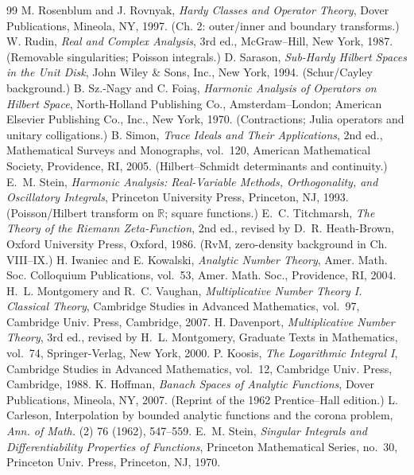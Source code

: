 \documentclass[11pt]{article}
\theoremstyle{definition}
\theoremstyle{remark}
\theoremstyle{definition}
\begin{document}
\begin{thebibliography}{99}
 M. Rosenblum and J. Rovnyak, \emph{Hardy Classes and Operator Theory}, Dover Publications, Mineola, NY, 1997. (Ch. 2: outer/inner and boundary transforms.)
 W. Rudin, \emph{Real and Complex Analysis}, 3rd ed., McGraw--Hill, New York, 1987. (Removable singularities; Poisson integrals.)
 D. Sarason, \emph{Sub-Hardy Hilbert Spaces in the Unit Disk}, John Wiley \& Sons, Inc., New York, 1994. (Schur/Cayley background.)
 B. Sz.-Nagy and C. Foia\c s, \emph{Harmonic Analysis of Operators on Hilbert Space}, North-Holland Publishing Co., Amsterdam--London; American Elsevier Publishing Co., Inc., New York, 1970. (Contractions; Julia operators and unitary colligations.)
 B. Simon, \emph{Trace Ideals and Their Applications}, 2nd ed., Mathematical Surveys and Monographs, vol.~120, American Mathematical Society, Providence, RI, 2005. (Hilbert--Schmidt determinants and continuity.)
 E.~M. Stein, \emph{Harmonic Analysis: Real-Variable Methods, Orthogonality, and Oscillatory Integrals}, Princeton University Press, Princeton, NJ, 1993. (Poisson/Hilbert transform on $\mathbb R$; square functions.)
 E.~C. Titchmarsh, \emph{The Theory of the Riemann Zeta-Function}, 2nd ed., revised by D.~R. Heath-Brown, Oxford University Press, Oxford, 1986. (RvM, zero-density background in Ch. VIII--IX.)
 H. Iwaniec and E. Kowalski, \emph{Analytic Number Theory}, Amer. Math. Soc. Colloquium Publications, vol.~53, Amer. Math. Soc., Providence, RI, 2004.
 H.~L. Montgomery and R.~C. Vaughan, \emph{Multiplicative Number Theory I. Classical Theory}, Cambridge Studies in Advanced Mathematics, vol.~97, Cambridge Univ. Press, Cambridge, 2007.
 H. Davenport, \emph{Multiplicative Number Theory}, 3rd ed., revised by H.~L. Montgomery, Graduate Texts in Mathematics, vol.~74, Springer-Verlag, New York, 2000.
 P. Koosis, \emph{The Logarithmic Integral I}, Cambridge Studies in Advanced Mathematics, vol.~12, Cambridge Univ. Press, Cambridge, 1988.
 K. Hoffman, \emph{Banach Spaces of Analytic Functions}, Dover Publications, Mineola, NY, 2007. (Reprint of the 1962 Prentice--Hall edition.)
 L. Carleson, Interpolation by bounded analytic functions and the corona problem, \emph{Ann. of Math.} (2) 76 (1962), 547--559.
 E.~M. Stein, \emph{Singular Integrals and Differentiability Properties of Functions}, Princeton Mathematical Series, no.~30, Princeton Univ. Press, Princeton, NJ, 1970.

\end{thebibliography}
\end{document}
